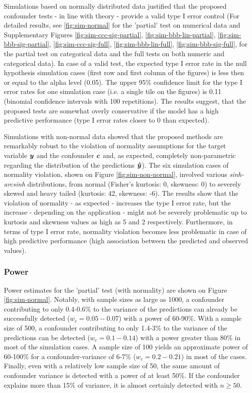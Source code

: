 \documentclass{article}
\begin{document}
Simulations based on normally distributed data justified that the proposed confounder tests - in line with theory - provide a valid type I error control (For detailed results, see \ref{fig:sim-normal} for the 'partial' test on numerical data and Supplementary Figures \ref{fig:sim-ccc-sig-partial}, \ref{fig:sim-bbb-lin-partial}, \ref{fig:sim-bbb-sig-partial}, \ref{fig:sim-ccc-sig-full}, \ref{fig:sim-bbb-lin-full}, \ref{fig:sim-bbb-sig-full}, for the partial test on categorical data and the full tests on both numeric and categorical data). 
In case of a valid test, the expected type I error rate in the null hypothesis simulation cases (first row and first column of the figures) is less then or equal to the alpha level (0.05). The upper 95\% confidence limit for the type I error rates for one simulation case (i.e. a single tile on the figures) is 0.11 (binomial confidence intervals with 100 repetitions). 
The results suggest, that the proposed tests are somewhat overly conservative if the model has a high predictive performance (type I error rates closer to 0 than expected).

Simulations with non-normal data showed that the proposed methods are remarkably robust to the violation of normality assumptions for the target variable $\boldsymbol{y}$ and the confounder $\boldsymbol{c}$ and, as expected, completely non-parametric regarding the distribution of the predictions $\boldsymbol{\hat{y}}$). The six simulation cases of normality violation, shown on Figure \ref{fig:sim-non-normal}, involved various \emph{sinh-arcsinh} distributions, from normal (Fisher's kurtosis: 0, skewness: 0) to severely skewed and heavy tailed (kurtosis: 42, skewness: -6).
The results show that the violation of normality - as expected - increases the type I error rate, but the increase - depending on the application - might not be severely problematic up to kurtosis and skewness values as high as 5 and 2 respectively. Furthermore, in terms of type I error rate, normality violation becomes less problematic in case of high predictive performance (high association between the predicted and observed values).

\subsubsection*{Power}

Power estimates for the 'partial' test (with normality) are shown on Figure \ref{fig:sim-normal}. Notably, with sample sizes as large as 1000, a confounder contributing to only 0.4-0.6\% to the variance of the predictions can already be successfully detected ($w_c = 0.05 - 0.07$) with a power of 60-90\%. With a sample size of 500, a confounder contributing to only 1.4-3\% to the variance of the predictions can be detected ($w_c = 0.1 - 0.14$) with a power greater than 80\% in most of the simulation cases. A sample size of 100 yields an approximate power of 60-100\% for a confounder-variance of 6-7\% ($w_c = 0.2 - 0.21$) in most of the cases. Finally, even with a relatively low sample size of 50, the same amount of confounder variance is detected with a power of at least 50\%. If the confounder explains more than 15\% of variance, it is almost certainly detected with $n \geq 50$.
\end{document}
